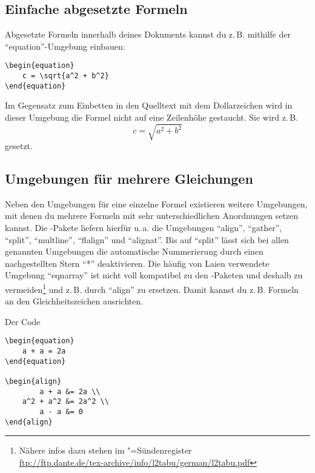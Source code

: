\subsection{Einfache abgesetzte Formeln}

Abgesetzte Formeln innerhalb deines Dokuments kannst du z.\,B. mithilfe der \enquote{equation}-Umgebung einbauen:
\begin{lstlisting}
\begin{equation}
	c = \sqrt{a^2 + b^2}
\end{equation}
\end{lstlisting}

Im Gegensatz zum Einbetten in den Quelltext mit dem Dollarzeichen wird in dieser Umgebung die Formel nicht auf eine Zeilenhöhe gestaucht. Sie wird z.\,B.
\begin{equation}
	c = \sqrt{a^2 + b^2}
\end{equation}
gesetzt.

\subsection{Umgebungen für mehrere Gleichungen}

Neben den Umgebungen für eine einzelne Formel existieren weitere Umgebungen, mit denen du mehrere Formeln mit sehr unterschiedlichen Anordnungen setzen kannst. Die \AmSmath-Pakete liefern hierfür u.\,a. die Umgebungen \enquote{align}, \enquote{gather}, \enquote{split}, \enquote{multline}, \enquote{flalign} und \enquote{alignat}. Bis auf \enquote{split} lässt sich bei allen genannten Umgebungen die automatische Nummerierung durch einen nachgestellten Stern \enquote{*} deaktivieren. Die häufig von Laien verwendete Umgebung \enquote{eqnarray} ist nicht voll kompatibel zu den \AmSmath-Paketen und deshalb zu vermeiden\footnote{Nähere infos dazu stehen im \DMLLaTeX"=Sündenregister\\\href{ftp://ftp.dante.de/tex-archive/info/l2tabu/german/l2tabu.pdf}{ftp://ftp.dante.de/tex-archive/info/l2tabu/german/l2tabu.pdf}} und z.\,B. durch \enquote{align} zu ersetzen. Damit kannst du z.\,B. Formeln an den Gleichheitszeichen ausrichten.

Der Code
\begin{lstlisting}
\begin{equation}
	a + a = 2a
\end{equation}

\begin{align}
	    a + a &= 2a \\
	a^2 + a^2 &= 2a^2 \\
	    a - a &= 0
\end{align}
\end{lstlisting} 

